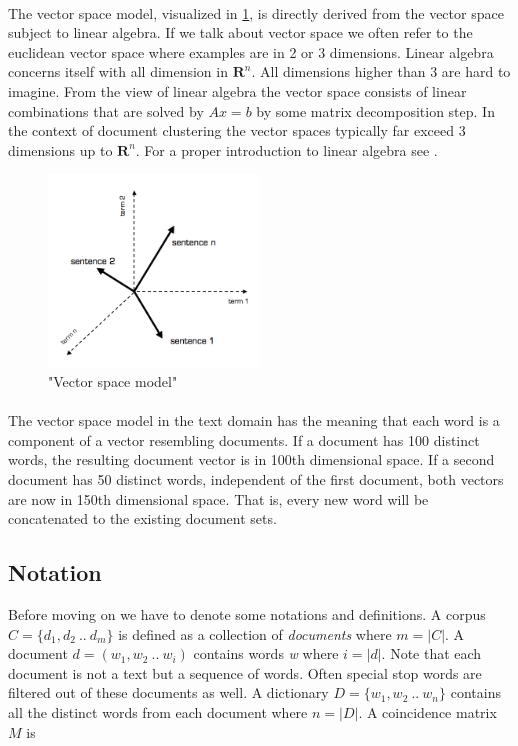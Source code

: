   \paragraph{}
  The vector space model, visualized in \ref{vsm_pic}, is directly derived from the vector space subject to linear algebra. If we talk about vector space we often refer to the euclidean vector space where examples are in 2 or 3 dimensions. Linear algebra concerns itself with all dimension in $\mathbf{R}^{n}$. All dimensions higher than 3 are hard to imagine. From the view of linear algebra the vector space consists of linear combinations that are solved by $Ax = b$ by some matrix decomposition step. In the context of document clustering the vector spaces typically far exceed 3 dimensions up to $\mathbf{R}^{n}$. For a proper introduction to linear algebra see \cite{Strang2009}.

  \begin{figure}[h!]
    \centering
      \includegraphics[width=0.5\textwidth]{vsm.png}
      \caption{"Vector space model"}
      \label{vsm_pic}
  \end{figure}

  \paragraph{}
  The vector space model in the text domain has the meaning that each word is a component of a vector resembling documents. If a document has 100 distinct words, the resulting document vector is in 100th dimensional space. If a second document has 50 distinct words, independent of the first document, both vectors are now in 150th dimensional space. That is, every new word will be concatenated to the existing document sets.

  \subsection{Notation}
    Before moving on we have to denote some notations and definitions. 
    A corpus $C = \{d_1, d_2 \: .. \: d_m\}$ is defined as a collection of \emph{documents} where $m = |C|$. A document $d = (w_1, w_2 \: .. \: w_i)$ contains words \emph{w} where $i = |d|$. Note that each document is not a text but a sequence of words. Often special stop words are filtered out of these documents as well. A dictionary $D = \{w_1, w_2 \: .. \: w_n\}$ contains all the distinct words from each document where $n = |D|$. A coincidence matrix $M$ is

